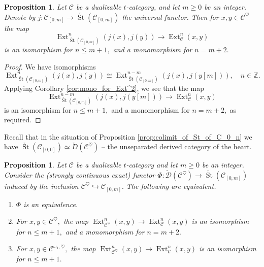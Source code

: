 \documentclass[11pt,leqno]{amsart}
\newtheorem{prop}[theo]{Proposition}
\numberwithin{equation}{section}
\def\Z{\mathbb{Z}}
\newcommand{\hto}{\hookrightarrow}
\newcommand{\St}{\operatorname{St}}
\newcommand{\cD}{{\mathcal D}}
\newcommand{\cC}{{\mathcal C}}
\newcommand{\Ext}{\operatorname{Ext}}
\begin{document}
\begin{prop}\label{prop:properties_of_functor_St_of_C_0_m_to_C}
	Let $\cC$ be a dualizable $t$-category, and let $m\geq 0$ be an integer. Denote by $j:\cC_{[0,m]}\to\check{\St}(\cC_{[0,m]})$ the universal functor. Then for $x,y\in\cC^{\heartsuit}$ the map
	\begin{equation*}
		\Ext^n_{\check{\St}(\cC_{[0,m]})}(j(x),j(y))\to\Ext^n_{\cC}(x,y)
	\end{equation*} 
	is an isomorphism for $n\leq m+1,$ and a monomorphism for $n=m+2.$ 
\end{prop}

\begin{proof}
We have isomorphisms
\begin{equation*}
\Ext^n_{\check{\St}(\cC_{[0,m]})}(j(x),j(y))\cong \Ext^{n-m}_{\check{\St}(\cC_{[0,m]})}(j(x),j(y[m])),\quad n\in\Z.
\end{equation*}
Applying Corollary \ref{cor:mono_for_Ext^2}, we see that the map
\begin{equation*}
	\Ext^{n-m}_{\check{\St}(\cC_{[0,m]})}(j(x),j(y[m]))\to \Ext^n_{\cC}(x,y)
\end{equation*}
is an isomorphism for $n\leq m+1,$ and a monomorphism for $n=m+2,$ as required.
\end{proof}

Recall that in the situation of Proposition \ref{prop:colimit_of_St_of_C_0_n} we have $\check{\St}(\cC_{[0,0]})\simeq \check{D}(\cC^{\heartsuit})$ -- the unseparated derived category of the heart.

\begin{prop}\label{prop:when_partial_realization_is_an_equivalence}
Let $\cC$ be a dualizable $t$-category and let $m\geq 0$ be an integer. Consider the (strongly continuous exact) functor $\Phi:\check{\cD}(\cC^{\heartsuit})\to \check{\St}(\cC_{[0,m]})$ induced by the inclusion $\cC^{\heartsuit}\hto\cC_{[0,m]}.$ The following are equivalent.
\begin{enumerate}[label=(\roman*),ref=(\roman*)]
	\item $\Phi$ is an equivalence. \label{partial_realization_equivalence}
	\item For $x,y\in\cC^{\heartsuit},$ the map $\Ext^n_{\cC^{\heartsuit}}(x,y)\to \Ext^n_{\cC}(x,y)$ is an isomorphism for $n\leq m+1,$ and a monomorphism for $n=m+2.$ \label{-m-2_connectivity_for_realization_functor}
	\item For $x,y\in\cC^{\omega_1,\heartsuit},$ the map $\Ext^n_{\cC^{\heartsuit}}(x,y)\to \Ext^n_{\cC}(x,y)$ is an isomorphism for $n\leq m+1.$ \label{isomorphisms_on_Ext_leq_m+1}
\end{enumerate}
\end{prop}
\end{document}
